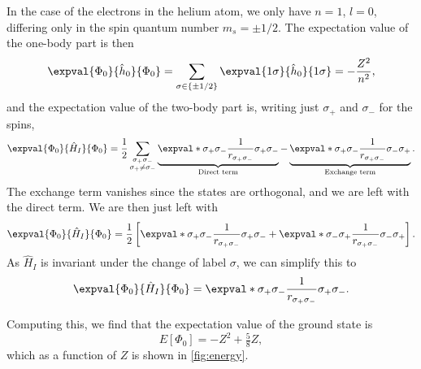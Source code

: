 In the case of the electrons in the helium atom, we only have $n = 1$, $l = 0$, differing only in the spin quantum number $m_s = \pm 1/2$.
The expectation value of the one-body part is then
\begin{equation*}
    \expval{\Phi_0}{\hat{h}_0}{\Phi_0} = \sum_{\sigma \in \{\pm 1/2\}} \expval{1\sigma}{\hat{h}_0}{1\sigma} = -\frac{Z^2}{n^2},
\end{equation*}
and the expectation value of the two-body part is, writing just $\sigma_{+}$ and $\sigma_{-}$ for the spins,
\begin{equation*}
    \expval{\Phi_0}{\hat{H}_I}{\Phi_0}
    = \frac{1}{2} \sum_{\substack{\sigma_{+}\sigma_{-}\\ \sigma_{+} \neq \sigma_{-}}}
    \underbrace{\expval*{\sigma_{+} \sigma_{-}}{\frac{1}{r_{\sigma_{+}\sigma_{-}}}}{\sigma_{+} \sigma_{-}}}_{\textnormal{Direct term}}
    - \underbrace{\expval*{\sigma_{+} \sigma_{-}}{\frac{1}{r_{\sigma_{+}\sigma_{-}}}}{\sigma_{-}\sigma_{+}}}_{\textnormal{Exchange term}}.
\end{equation*}
The exchange term vanishes since the states are orthogonal, and we are left with the direct term.
We are then just left with
\begin{equation*}
    \expval{\Phi_0}{\hat{H}_I}{\Phi_0} = \frac{1}{2}\left[ \expval*{\sigma_{+} \sigma_{-}}{\frac{1}{r_{\sigma_{+} \sigma_{-}}}}{\sigma_{+} \sigma_{-}} + \expval*{\sigma_{-} \sigma_{+}}{\frac{1}{r_{\sigma_{+} \sigma_{-}}}}{\sigma_{-} \sigma_{+}}\right].
\end{equation*}
As $\hat{H}_I$ is invariant under the change of label $\sigma$, we can simplify this to
\begin{equation*}
    \expval{\Phi_0}{\hat{H}_I}{\Phi_0} = \expval*{\sigma_{+} \sigma_{-}}{\frac{1}{r_{\sigma_{+} \sigma_{-}}}}{\sigma_{+} \sigma_{-}}.
\end{equation*}

Computing this, we find that the expectation value of the ground state is
\begin{equation}
    E[\Phi_0] = -Z^2 + \tfrac{5}{8}Z,
\end{equation}
which as a function of $Z$ is shown in \autoref{fig:energy}.

